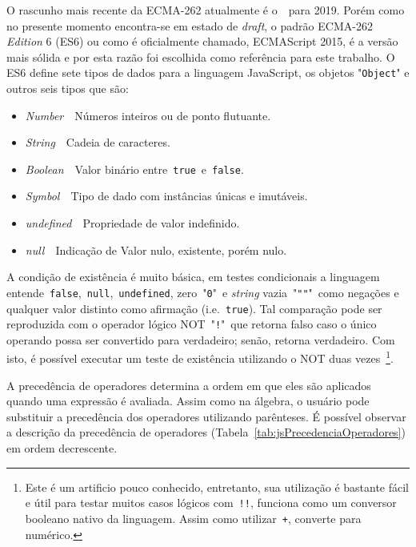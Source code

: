 O rascunho mais recente da ECMA-262 atualmente é o~~para 2019. Porém como no presente momento encontra-se em estado de \textit{draft}, o padrão ECMA-262 \textit{Edition} 6 (ES6) ou como é oficialmente chamado, ECMAScript 2015, é a versão mais sólida e por esta razão foi escolhida como referência para este trabalho. O ES6 define sete tipos de dados para a linguagem JavaScript, os objetos "\texttt{Object}" e outros seis tipos que são:
\begin{itemize}
    \item \textit{Number}~\textemdash~Números inteiros ou de ponto flutuante.
    \item \textit{String}~\textemdash~Cadeia de caracteres.
    \item \textit{Boolean}~\textemdash~Valor binário entre~\texttt{true}~e~\texttt{false}.
    \item \textit{Symbol}~\textemdash~Tipo de dado com instâncias únicas e imutáveis.
    \item \textit{undefined}~\textemdash~Propriedade de valor indefinido.
    \item \textit{null}~\textemdash~Indicação de Valor nulo, existente, porém nulo.
\end{itemize}

A condição de existência é muito básica, em testes condicionais a linguagem entende~\texttt{false},~\texttt{null},~\texttt{undefined}, zero~"\texttt{0}"~e \textit{string} vazia~"\texttt{""}"~como negações e qualquer valor distinto como afirmação (i.e.~\texttt{true}). Tal comparação pode ser reproduzida com o operador lógico NOT~"\texttt{!}"~que retorna falso caso o único operando possa ser convertido para verdadeiro; senão, retorna verdadeiro. Com isto, é possível executar um teste de existência utilizando o NOT duas vezes~\footnote{Este é um artificio pouco conhecido, entretanto, sua utilização é bastante fácil e útil para testar muitos casos lógicos com~\texttt{!!}, funciona como um conversor booleano nativo da linguagem. Assim como utilizar~\texttt{+}, converte para numérico.}.

A precedência de operadores determina a ordem em que eles são aplicados quando uma expressão é avaliada. Assim como na álgebra, o usuário pode substituir a precedência dos operadores utilizando parênteses. É possível observar a descrição da precedência de operadores (Tabela~\ref{tab:jsPrecedenciaOperadores}) em ordem decrescente.

